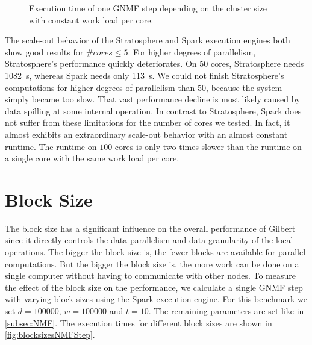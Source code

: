 \begin{figure}[h!]
	\centering
		\caption{Execution time of one GNMF step depending on the cluster size with constant work load per core.}
		\label{fig:nmfNodesRuntime}
\end{figure}

The scale-out behavior of the Stratosphere and Spark execution engines both show good results for $\#cores \le 5$.
For higher degrees of parallelism, Stratosphere's performance quickly deteriorates.
On $50$ cores, Stratosphere needs \SI{1082}{\second}, whereas Spark needs only \SI{113}{\second}.
We could not finish Stratosphere's computations for higher degrees of parallelism than $50$, because the system simply became too slow.
That vast performance decline is most likely caused by data spilling at some internal operation.
In contrast to Stratosphere, Spark does not suffer from these limitations for the number of cores we tested.
In fact, it almost exhibits an extraordinary scale-out behavior with an almost constant runtime.
The runtime on $100$ cores is only two times slower than the runtime on a single core with the same work load per core.

\section{Block Size}

The block size has a significant influence on the overall performance of Gilbert since it directly controls the data parallelism and data granularity of the local operations.
The bigger the block size is, the fewer blocks are available for parallel computations.
But the bigger the block size is, the more work can be done on a single computer without having to communicate with other nodes.
To measure the effect of the block size on the performance, we calculate a single GNMF step with varying block sizes using the Spark execution engine.
For this benchmark we set $d=100000$, $w = 100000$ and $t = 10$.
The remaining parameters are set like in \cref{subsec:NMF}.
The execution times for different block sizes are shown in \cref{fig:blocksizesNMFStep}.

